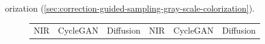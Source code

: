 orization (\autoref{sec:correction-guided-sampling-gray-scale-colorization}).

\begin{figure}[htp!]
    \centering
    \begin{tabularx}{\textwidth}{Y Y Y !{\space} Y Y Y}
        NIR                                                                                & CycleGAN                                                                                     & Diffusion                                                                                & NIR                                                                                & CycleGAN                                                                                     & Diffusion                                                                                \\

\end{tabularx}
\end{figure}
